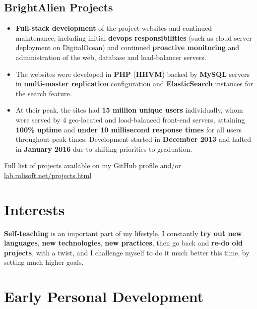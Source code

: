 \documentclass[11pt,a4paper,sans]{moderncv}
\renewcommand*{\httplink}[2][]{%
	\ifthenelse{\equal{#1}{}}%
	{\href{https://#2}{#2}}%
	{\href{https://#2}{#1}}}
\begin{document}
	\subsection{BrightAlien Projects}

	\begin{itemize}
		\item \textbf{Full-stack development} of the project websites and continued maintenance, including initial \textbf{devops responsibilities} (such as cloud server deployment on DigitalOcean) and continued \textbf{proactive monitoring} and administration of the web, database and load-balancer servers.

		\item The websites were developed in \textbf{PHP} (\textbf{HHVM}) backed by \textbf{MySQL} servers in \textbf{multi-master replication} configuration and \textbf{ElasticSearch} instances for the search feature.

		\item At their peak, the sites had \textbf{15 million unique users} individually, whom were served by 4 geo-located and load-balanced front-end servers, attaining \textbf{100\% uptime} and \textbf{under 10 millisecond response times} for all users throughout peak times. Development started in \textbf{December 2013} and halted in \textbf{January 2016} due to shifting priorities to graduation.
	\end{itemize}

	\vspace{6pt}

	Full list of projects available on my GitHub profile and/or \httplink{lab.rolisoft.net/projects.html}

\section{Interests}

	\textbf{Self-teaching} is an important part of my lifestyle, I constantly \textbf{try out new languages}, \textbf{new technologies}, \textbf{new practices}, then go back and \textbf{re-do old projects}, with a twist, and I challenge myself to do it much better this time, by setting much higher goals.

\section{Early Personal Development}
\end{document}
